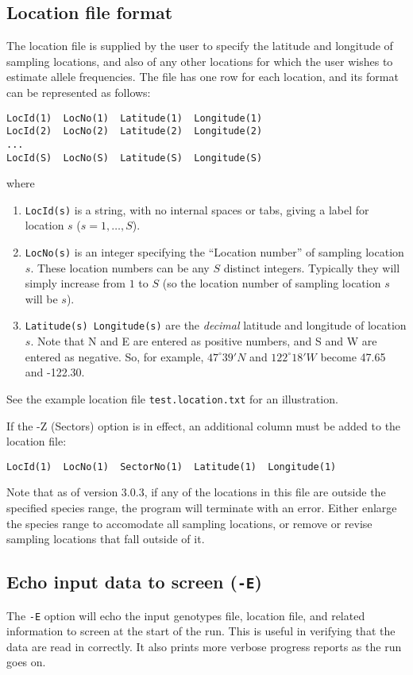 \documentclass[10pt,titlepage,times,letterpaper]{article}
\begin{document}
\subsection{Location file format}

The location file is supplied by the user to specify the latitude and
longitude of sampling locations, and also of any other locations
for which the user wishes to estimate allele frequencies.
The file has one row for each location, and its format 
can be represented as follows:
\begin{verbatim}
LocId(1)  LocNo(1)  Latitude(1)  Longitude(1)
LocId(2)  LocNo(2)  Latitude(2)  Longitude(2)
...
LocId(S)  LocNo(S)  Latitude(S)  Longitude(S)
\end{verbatim}
where
\begin{enumerate}
\item{\tt LocId(s)} is a string, with no internal spaces or tabs, giving a label for location $s$
($s = 1,\dots,S$).
\item{\tt LocNo(s)} is an integer specifying the ``Location
number'' of sampling location $s$. These location numbers can be
any $S$ distinct integers. Typically they will simply increase from $1$ to $S$
(so the location number of sampling location $s$ will be $s$). 
\item{{\tt Latitude(s) Longitude(s)}} are the {\it decimal} latitude
and longitude of location $s$. Note that N and E are entered as
positive numbers, and S and W are entered as negative. So, for
example, $47^\circ 39' N$ and $122^\circ 18' W$ become 47.65 and -122.30.
\end{enumerate}
See the example location file {\tt test.location.txt} for an illustration.

If the -Z (Sectors) option is in effect, an additional column must be added to
the location file:

\begin{small}
\begin{verbatim}
LocId(1)  LocNo(1)  SectorNo(1)  Latitude(1)  Longitude(1)
\end{verbatim}
\end{small}

Note that as of version 3.0.3, if any of the locations in this file are outside
the specified species range, the program will terminate with an error.  Either
enlarge the species range to accomodate all sampling locations, or remove or revise
sampling locations that fall outside of it.  

\subsection{Echo input data to screen ({\tt -E})}
The {\tt -E} option will echo the input genotypes file, location file, and 
related information
to screen at the start of the run.  This is useful in verifying that the data
are read in correctly.  It also prints more verbose progress reports as
the run goes on.
\end{document}

